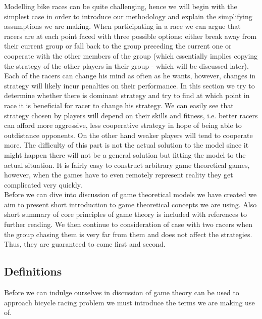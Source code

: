 \documentclass[10pt, a4paper]{report}
\begin{document}
Modelling bike races can be quite challenging, hence we will begin with the simplest case in order to introduce our methodology and explain the simplifying assumptions we are making. When participating in a race we can argue that racers are at each point faced with three possible options: either break away from their current group or fall back to the group preceding the current one or cooperate with the other members of the group (which essentially implies copying the strategy of the other players in their group - which will be discussed later). Each of the racers can change his mind as often as he wants, however, changes in strategy will likely incur penalties on their performance. In this section we try to determine whether there is dominant strategy and try to find at which point in race it is beneficial for racer to change his strategy. We can easily see that strategy chosen by players will depend on their skills and fitness, i.e. better racers can afford more aggressive, less cooperative strategy in hope of being able to outdistance opponents. On the other hand weaker players will tend to cooperate more. The difficulty of this part is not the actual solution to the model since it might happen there will not be a general solution but fitting the model to the actual situation. It is fairly easy to construct arbitrary game theoretical games, however, when the games have to even remotely represent reality they get complicated very quickly.\\

Before we can dive into discussion of game theoretical models we have created we aim to present short introduction to game theoretical concepts we are using. Also short summary of core principles of game theory is included with references to further reading. We then continue to consideration of case with two racers when the group chasing them is very far from them and does not affect the strategies. Thus, they are guaranteed to come first and second.

\subsection{Definitions}\label{subsec:defs}

Before we can indulge ourselves in discussion of game theory can be used to approach bicycle racing problem we must introduce the terms we are making use of.
\end{document}

